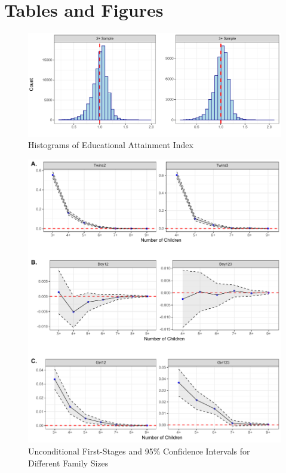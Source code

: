 \documentclass[11pt,a4paper]{article}
\begin{document}
\begin{onehalfspace}





\printbibliography

\end{onehalfspace}

\newpage
\section*{Tables and Figures}

\begin{figure}[h!]
\centering
\caption{\label{fig:01}Histograms of Educational Attainment Index}
\includegraphics[width=\textwidth]{figures/hists.pdf}
\end{figure}

\begin{figure}[h!]
\centering
\caption{\label{fig:02}Unconditional First-Stages and 95\% Confidence Intervals for Different Family Sizes}
\includegraphics[width=\textwidth]{figures/acrs.pdf}
\end{figure}
\end{document}
